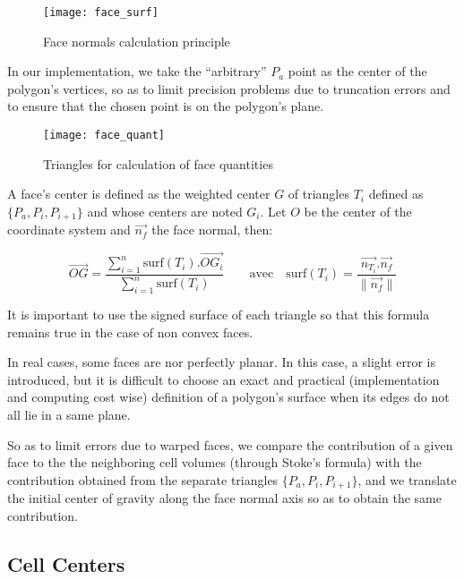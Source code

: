 \begin{figure}[!h]
\centerline{
\texttt{[image: face\_surf]}}
\caption{Face normals calculation principle}
\label{fig:algo.norm_fac.principle}
\end{figure}

In our implementation, we take the ``arbitrary'' $P_a$ point as
the center of the polygon's vertices, so as to limit
precision problems due to truncation errors and to ensure that
the chosen point is on the polygon's plane.

\begin{figure}[!h]
\centerline{
\texttt{[image: face\_quant]}}
\caption{Triangles for calculation of face quantities}
\label{fig:algo.grd_fac.triangles}
\end{figure}

A face's center is defined as the weighted center $G$ of triangles
$T_i$ defined as $\{P_a, P_i, P_{i+1}\}$ and whose centers are
noted $G_i$. Let $O$ be the center of the coordinate system and
$\overrightarrow{n_f}$ the face normal, then:

\begin{displaymath}
\overrightarrow{OG}
= \frac{\sum_{i=1}^n \textrm{surf}(T_i).\overrightarrow{OG_i}}
       {\sum_{i=1}^n \textrm{surf}(T_i)}
\qquad \textrm {avec} \quad
\textrm{surf}(T_i) = \frac{\overrightarrow{n_{T_i}}.\overrightarrow{n_f}}
                          {\parallel \overrightarrow{n_f} \parallel}
\end{displaymath}

It is important to use the signed surface of each triangle so
that this formula remains true in the case of non convex faces.

In real cases, some faces are nor perfectly planar. In this case,
a slight error is introduced, but it is difficult to choose an exact
and practical (implementation and computing cost wise) definition of a
polygon's surface when its edges do not all lie in a same plane.

So as to limit errors due to warped faces, we compare the contribution
of a given face to the the neighboring cell volumes (through
Stoke's formula) with the contribution obtained from the separate
triangles $\{P_a, P_i, P_{i+1}\}$, and we translate the initial center
of gravity along the face normal axis so as to obtain the same contribution.

\subsection*{Cell Centers%
               \label{sec:geo_quant.cdgcel}}

